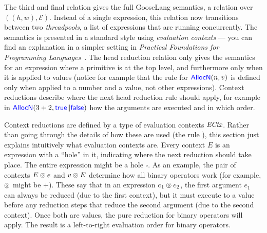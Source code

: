 The third and final relation gives the full GooseLang semantics, a relation over
$((h, w), \mathcal{E})$. Instead of a
single expression, this relation now transitions between two \emph{threadpools},
a list of expressions that are
running concurrently. The semantics is presented in a standard style using
\emph{evaluation contexts} --- you can find an explanation in a simpler setting
in \emph{Practical Foundations for Programming Languages}~\cite[\S
5.3]{harper:pfpl}. The head reduction relation only gives the semantics for an
expression where a primitive is at the top level, and furthermore only when it is
applied to values (notice for example that the rule for $\mathsf{\textcolor{blue}{AllocN}}(n, v)$
is defined only when applied to a number and a value, not other expressions).
Context reductions describe where the next head reduction rule should apply, for
example in $\mathsf{\textcolor{blue}{AllocN}}(3+2, \mathsf{\textcolor{blue}{true}} \| \mathsf{\textcolor{blue}{false}})$ how the arguments
are executed and in which order.

Context reductions are defined by a type of evaluation contexts
$\textit{ECtx}$. Rather than going through the details of how these are used
(the rule ), this section just explains intuitively what
evaluation contexts are. Every context $E$ is an expression with a ``hole'' in
it, indicating where the next reduction should take place. The entire expression
might be a hole $\square$. As an example, the pair of contexts $E \circledcirc e$ and
$v \circledcirc E$ determine how all binary operators work (for example, $\circledcirc$
might be $+$). These say that in an expression $e_{1} \circledcirc e_{2}$, the first argument
$e_{1}$ can always be reduced (due to the first context), but it must execute
to a value before any reduction steps that reduce the second argument (due to
the second context). Once both are values, the pure reduction for binary
operators will apply. The result is a left-to-right evaluation order for binary
operators.


